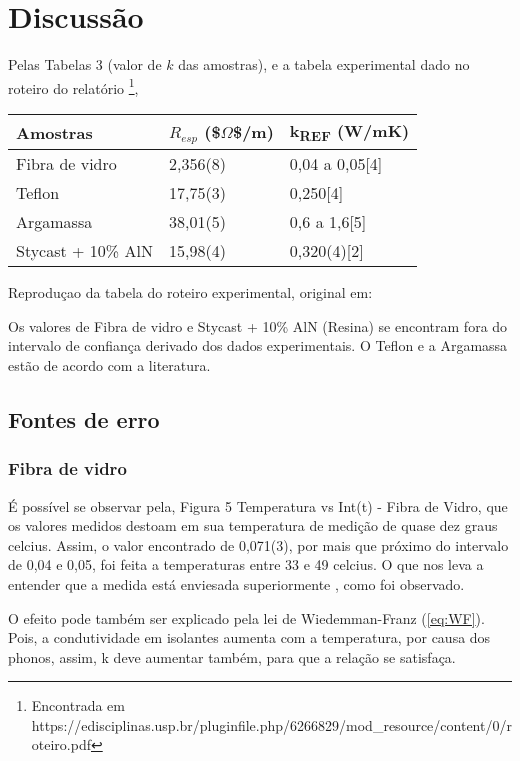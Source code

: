 \documentclass[11pt]{article}
\date{\today}
\title{}
\begin{document}
\tableofcontents

\section{Discussão}
\label{sec:org2914655}

Pelas Tabelas 3 (valor de \(k\) das amostras), e a tabela experimental dado no roteiro do relatório \footnote{Encontrada em https://edisciplinas.usp.br/pluginfile.php/6266829/mod_resource/content/0/roteiro.pdf},

\begin{center}
\begin{tabular}{lll}
\hline
Amostras & \(R_{esp}\) (\$\(\Omega\)\$/m) & k\textsubscript{REF} (W/mK)\\
\hline
Fibra de vidro & 2,356(8) & 0,04 a 0,05[4]\\
Teflon & 17,75(3) & 0,250[4]\\
Argamassa & 38,01(5) & 0,6 a 1,6[5]\\
Stycast + 10\% AlN & 15,98(4) & 0,320(4)[2]\\
\hline
\end{tabular}
\end{center}
Reproduçao  da tabela do roteiro experimental, original em: \cite{rebeca2021}

Os valores de Fibra de vidro e Stycast + 10\% AlN (Resina) se encontram fora do intervalo de confiança derivado dos dados experimentais. O Teflon e a Argamassa estão de acordo com a literatura.

\subsection{Fontes de erro}
\label{sec:orgf9934ec}
\subsubsection{Fibra de vidro}
\label{sec:org8c14fd0}
É possível se observar pela, Figura 5 Temperatura vs Int(t) - Fibra de Vidro, que os valores medidos destoam em sua temperatura de medição de quase dez graus celcius. Assim, o valor encontrado de 0,071(3), por mais que próximo do intervalo de 0,04 e 0,05, foi feita a temperaturas entre 33 e 49 celcius. O que nos leva a entender que a medida está enviesada superiormente \cite{ochs2005temperature,budaiwi2002variations}, como foi observado.

O efeito pode também ser explicado pela lei de Wiedemman-Franz (\autoref{eq:WF}). Pois, a condutividade em isolantes aumenta com a temperatura, por causa dos phonos, assim, k deve aumentar também, para que a relação se satisfaça.
\end{document}
